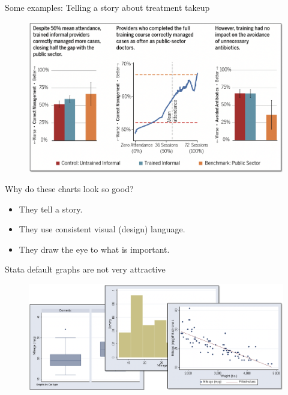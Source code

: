 \documentclass[aspectratio=169]{beamer}
\begin{document}
\begin{frame}{Some examples: Telling a story about treatment takeup}
	
	\begin{figure}
		\centering
		\includegraphics[width=\linewidth]{img/Correlation3}
	\end{figure}
	
\end{frame}


\begin{frame}{Why do these charts look so good?}
		
		\begin{itemize}[<default overlay specification>]
			\item<1> They tell a story.
			\item<1> They use consistent visual (design) language.
			\item<1> They draw the eye to what is important.
		\end{itemize}
		
\end{frame}


\begin{frame}{Stata default graphs are not very attractive}
	
	\begin{figure}
		\centering
		\includegraphics[width=\linewidth]{img/Graph}
	\end{figure}
	
\end{frame}
\end{document}

